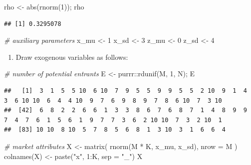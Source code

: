 \documentclass[
]{book}
\newenvironment{Shaded}{\begin{snugshade}}{\end{snugshade}}
\newcommand{\AttributeTok}[1]{\textcolor[rgb]{0.77,0.63,0.00}{#1}}
\newcommand{\CommentTok}[1]{\textcolor[rgb]{0.56,0.35,0.01}{\textit{#1}}}
\newcommand{\DecValTok}[1]{\textcolor[rgb]{0.00,0.00,0.81}{#1}}
\newcommand{\FunctionTok}[1]{\textcolor[rgb]{0.00,0.00,0.00}{#1}}
\newcommand{\NormalTok}[1]{#1}
\newcommand{\OtherTok}[1]{\textcolor[rgb]{0.56,0.35,0.01}{#1}}
\newcommand{\SpecialCharTok}[1]{\textcolor[rgb]{0.00,0.00,0.00}{#1}}
\newcommand{\StringTok}[1]{\textcolor[rgb]{0.31,0.60,0.02}{#1}}
\providecommand{\tightlist}{%
  \setlength{\itemsep}{0pt}\setlength{\parskip}{0pt}}
\begin{document}
\begin{Shaded}
\begin{Highlighting}[]
\NormalTok{rho }\OtherTok{\textless{}{-}} \FunctionTok{abs}\NormalTok{(}\FunctionTok{rnorm}\NormalTok{(}\DecValTok{1}\NormalTok{)); rho}
\end{Highlighting}
\end{Shaded}

\begin{verbatim}
## [1] 0.3295078
\end{verbatim}

\begin{Shaded}
\begin{Highlighting}[]
\CommentTok{\# auxiliary parameters}
\NormalTok{x\_mu }\OtherTok{\textless{}{-}} \DecValTok{1}
\NormalTok{x\_sd }\OtherTok{\textless{}{-}} \DecValTok{3}
\NormalTok{z\_mu }\OtherTok{\textless{}{-}} \DecValTok{0}
\NormalTok{z\_sd }\OtherTok{\textless{}{-}} \DecValTok{4}
\end{Highlighting}
\end{Shaded}

\begin{enumerate}
\def\labelenumi{\arabic{enumi}.}
\setcounter{enumi}{2}
\tightlist
\item
  Draw exogenous variables as follows:
\end{enumerate}

\begin{Shaded}
\begin{Highlighting}[]
\CommentTok{\# number of potential entrants}
\NormalTok{E }\OtherTok{\textless{}{-}}\NormalTok{ purrr}\SpecialCharTok{::}\FunctionTok{rdunif}\NormalTok{(M, }\DecValTok{1}\NormalTok{, N); E}
\end{Highlighting}
\end{Shaded}

\begin{verbatim}
##   [1]  3  1  5  5 10  6 10  7  9  5  5  9  9  5  5  2 10  9  1  4  3  6 10 10  6  4  4 10  9  7  6  9  8  9  7  8  6 10  7  3 10
##  [42]  6  8  2  2  6  6  1  3  3  8  6  7  6  8  7  1  4  8  9  9  7  4  7  6  1  5  6  1  9  7  7  3  6  2 10 10  7  3  2 10  1
##  [83] 10 10  8 10  5  7  8  5  6  8  1  3 10  3  1  6  6  4
\end{verbatim}

\begin{Shaded}
\begin{Highlighting}[]
\CommentTok{\# market attributes}
\NormalTok{X }\OtherTok{\textless{}{-}} \FunctionTok{matrix}\NormalTok{(}
  \FunctionTok{rnorm}\NormalTok{(M }\SpecialCharTok{*}\NormalTok{ K, x\_mu, x\_sd),}
  \AttributeTok{nrow =}\NormalTok{ M}
\NormalTok{)}
\FunctionTok{colnames}\NormalTok{(X) }\OtherTok{\textless{}{-}} \FunctionTok{paste}\NormalTok{(}\StringTok{"x"}\NormalTok{, }\DecValTok{1}\SpecialCharTok{:}\NormalTok{K, }\AttributeTok{sep =} \StringTok{"\_"}\NormalTok{)}
\NormalTok{X}
\end{Highlighting}
\end{Shaded}
\end{document}
